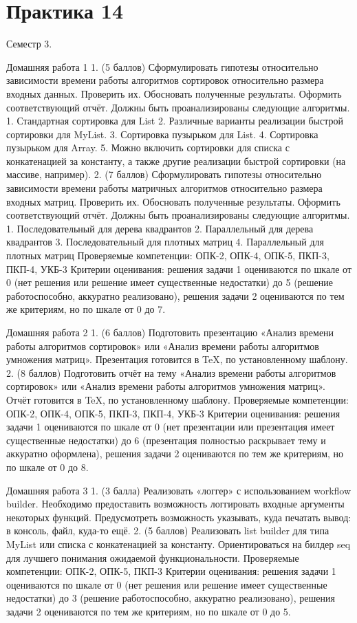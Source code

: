 \section{Практика 14}

Семестр 3.

Домашняя работа 1
    1. (5 баллов) Сформулировать гипотезы относительно зависимости времени работы алгоритмов  сортировок относительно размера входных данных. Проверить их. Обосновать полученные результаты. Оформить соответствующий отчёт. Должны быть проанализированы следующие алгоритмы.
        1. Стандартная сортировка для List
        2. Различные варианты реализации быстрой сортировки для MyList.
        3. Сортировка пузырьком для List.
        4. Сортировка пузырьком для Array.
        5. Можно включить сортировки для списка с конкатенацией за константу, а также другие реализации быстрой сортировки (на массиве, например).
    2. (7 баллов) Сформулировать гипотезы относительно зависимости времени работы матричных алгоритмов относительно размера входных матриц. Проверить их. Обосновать полученные результаты. Оформить соответствующий отчёт. Должны быть проанализированы следующие алгоритмы.
        1. Последовательный для дерева квадрантов
        2. Параллельный для дерева квадрантов
        3. Последовательный для плотных матриц
        4. Параллельный для плотных матриц
Проверяемые компетенции: ОПК-2, ОПК-4, ОПК-5, ПКП-3, ПКП-4, УКБ-3
Критерии оценивания: решения задачи 1 оцениваются по шкале от 0 (нет решения или решение имеет существенные недостатки) до 5 (решение работоспособно, аккуратно реализовано), решения задачи 2 оцениваются по тем же критериям, но по шкале от 0 до 7.

Домашняя работа 2
    1. (6 баллов) Подготовить презентацию «Анализ времени работы алгоритмов сортировок» или «Анализ времени работы алгоритмов умножения матриц». Презентация готовится в TeX, по установленному шаблону.
    2. (8 баллов) Подготовить отчёт на тему «Анализ времени работы алгоритмов сортировок» или «Анализ времени работы алгоритмов умножения матриц». Отчёт готовится в TeX, по установленному шаблону.
Проверяемые компетенции: ОПК-2, ОПК-4, ОПК-5, ПКП-3, ПКП-4, УКБ-3
Критерии оценивания: решения задачи 1 оцениваются по шкале от 0 (нет презентации или презентация имеет существенные недостатки) до 6 (презентация полностью раскрывает тему и аккуратно оформлена), решения задачи 2 оцениваются по тем же критериям, но по шкале от 0 до 8.

Домашняя работа 3
    1. (3 балла) Реализовать «логгер» с использованием workflow builder. Необходимо предоставить возможность логгировать входные аргументы некоторых функций. Предусмотреть возможность указывать, куда печатать вывод: в консоль, файл, куда-то ещё.
    2. (5 баллов) Реализовать list builder для типа MyList или списка с конкатенацией за константу. Ориентироваться на билдер seq для лучшего понимания ожидаемой функциональности.
Проверяемые компетенции: ОПК-2, ОПК-5, ПКП-3
Критерии оценивания: решения задачи 1 оцениваются по шкале от 0 (нет решения или решение имеет существенные недостатки) до 3 (решение работоспособно, аккуратно реализовано), решения задачи 2 оцениваются по тем же критериям, но по шкале от 0 до 5.

